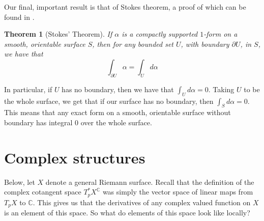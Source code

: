 \documentclass[11pt]{report}
\newtheorem{thm}{Theorem}[section]
\theoremstyle{definition}
\begin{document}
Our final, important result is that of Stokes theorem, a proof of which can be found in \cite[Theorem 5-5]{spivak}.
\begin{thm}[Stokes' Theorem]
  If $\alpha$ is a compactly supported $1$-form on a smooth, orientable surface $S$, then for any bounded set $U$, with boundary $\partial U$, in $S$, we have that 
  \[\int_{\partial U} \alpha = \int_U d\alpha \]
 
\end{thm} 
In particular, if $U$ has no boundary, then we have that $\int_U d\alpha = 0$. Taking $U$ to be the whole surface, we get that if our surface has no boundary, then $\int_S d\alpha = 0$. This means that any exact form on a smooth, orientable surface without boundary has integral $0$ over the whole surface.

\section{Complex structures}
Below, let $X$ denote a general Riemann surface. Recall that the definition of the complex cotangent space $T^*_pX^{\mathbb{C}}$ was simply the vector space of linear maps from $T_pX$ to $\mathbb{C}$. This gives us that the derivatives of any complex valued function on $X$ is an element of this space. So what do elements of this space look like locally? 
\end{document}
